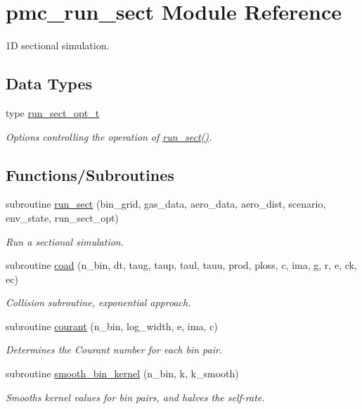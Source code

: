 \hypertarget{namespacepmc__run__sect}{}\section{pmc\+\_\+run\+\_\+sect Module Reference}
\label{namespacepmc__run__sect}


1D sectional simulation.  


\subsection*{Data Types}
\begin{DoxyCompactItemize}
\item 
type \mbox{\hyperlink{structpmc__run__sect_1_1run__sect__opt__t}{run\+\_\+sect\+\_\+opt\+\_\+t}}
\begin{DoxyCompactList}\small\item\em Options controlling the operation of \mbox{\hyperlink{namespacepmc__run__sect_a98f7b8811139683010e8a70346452ac2}{run\+\_\+sect()}}. \end{DoxyCompactList}\end{DoxyCompactItemize}
\subsection*{Functions/\+Subroutines}
\begin{DoxyCompactItemize}
\item 
subroutine \mbox{\hyperlink{namespacepmc__run__sect_a98f7b8811139683010e8a70346452ac2}{run\+\_\+sect}} (bin\+\_\+grid, gas\+\_\+data, aero\+\_\+data, aero\+\_\+dist, scenario, env\+\_\+state, run\+\_\+sect\+\_\+opt)
\begin{DoxyCompactList}\small\item\em Run a sectional simulation. \end{DoxyCompactList}\item 
subroutine \mbox{\hyperlink{namespacepmc__run__sect_ab0cefd419d24a8416f61f3d6a1098f0e}{coad}} (n\+\_\+bin, dt, taug, taup, taul, tauu, prod, ploss, c, ima, g, r, e, ck, ec)
\begin{DoxyCompactList}\small\item\em Collision subroutine, exponential approach. \end{DoxyCompactList}\item 
subroutine \mbox{\hyperlink{namespacepmc__run__sect_a55df1799d03853355ca1d55274b370df}{courant}} (n\+\_\+bin, log\+\_\+width, e, ima, c)
\begin{DoxyCompactList}\small\item\em Determines the Courant number for each bin pair. \end{DoxyCompactList}\item 
subroutine \mbox{\hyperlink{namespacepmc__run__sect_af8c0ab7ec5c461726865d56af791a77a}{smooth\+\_\+bin\+\_\+kernel}} (n\+\_\+bin, k, k\+\_\+smooth)
\begin{DoxyCompactList}\small\item\em Smooths kernel values for bin pairs, and halves the self-\/rate. \end{DoxyCompactList}\end{DoxyCompactItemize}


